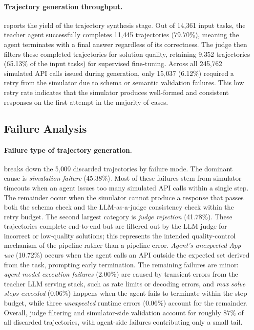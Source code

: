\paragraph{Trajectory generation throughput.}
 reports the yield of the trajectory synthesis stage. Out of 14,361 input tasks, the teacher agent successfully completes 11,445 trajectories (79.70\%), meaning the agent terminates with a final answer regardless of its correctness. The judge then filters these completed trajectories for solution quality, retaining 9,352 trajectories (65.13\% of the input tasks) for supervised fine-tuning. Across all 245,762 simulated API calls issued during generation, only 15,037 (6.12\%) required a retry from the simulator due to schema or semantic validation failures. This low retry rate indicates that the simulator produces well-formed and consistent responses on the first attempt in the majority of cases.

\subsection{Failure Analysis}

\paragraph{Failure type of trajectory generation.}
 breaks down the 5,009 discarded trajectories by failure mode. The dominant cause is \emph{simulation failure} (45.38\%). Most of these failures stem from simulator timeouts when an agent issues too many simulated API calls within a single step. The remainder occur when the simulator cannot produce a response that passes both the schema check and the LLM-as-a-judge consistency check within the retry budget. The second largest category is \emph{judge rejection} (41.78\%). These trajectories complete end-to-end but are filtered out by the LLM judge for incorrect or low-quality solutions; this represents the intended quality-control mechanism of the pipeline rather than a pipeline error. \emph{Agent's unexpected App use} (10.72\%) occurs when the agent calls an API outside the expected set derived from the task, prompting early termination. The remaining failures are minor: \emph{agent model execution failures} (2.00\%) are caused by transient errors from the teacher LLM serving stack, such as rate limits or decoding errors, and \emph{max solve steps exceeded} (0.06\%) happens when the agent fails to terminate within the step budget, while three \emph{unexpected} runtime errors (0.06\%) account for the remainder. Overall, judge filtering and simulator-side validation account for roughly 87\% of all discarded trajectories, with agent-side failures contributing only a small tail.


